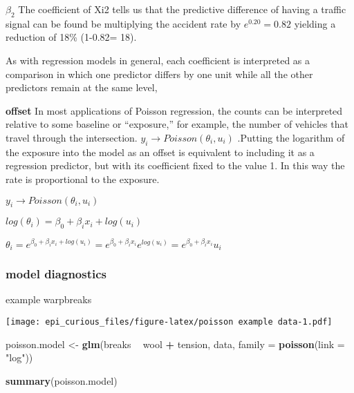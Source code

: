 \documentclass[
]{article}
\newenvironment{Shaded}{\begin{snugshade}}{\end{snugshade}}
\newcommand{\DataTypeTok}[1]{\textcolor[rgb]{0.13,0.29,0.53}{#1}}
\newcommand{\KeywordTok}[1]{\textcolor[rgb]{0.13,0.29,0.53}{\textbf{#1}}}
\newcommand{\NormalTok}[1]{#1}
\newcommand{\OperatorTok}[1]{\textcolor[rgb]{0.81,0.36,0.00}{\textbf{#1}}}
\newcommand{\StringTok}[1]{\textcolor[rgb]{0.31,0.60,0.02}{#1}}
\begin{document}
\(\beta_2\) The coefficient of Xi2 tells us that the predictive
difference of having a traffic signal can be found be multiplying the
accident rate by \(e^{0.20} = 0.82\) yielding a reduction of 18\%
(1-0.82= 18).

As with regression models in general, each coefficient is interpreted as
a comparison in which one predictor differs by one unit while all the
other predictors remain at the same level,

\textbf{offset} In most applications of Poisson regression, the counts
can be interpreted relative to some baseline or ``exposure,'' for
example, the number of vehicles that travel through the intersection.
\(y_i \to Poisson(\theta_i, u_i)\) .Putting the logarithm of the
exposure into the model as an offset is equivalent to including it as a
regression predictor, but with its coefficient fixed to the value 1. In
this way the rate is proportional to the exposure.

\(y_i \to Poisson(\theta_i, u_i)\)

\(log(\theta_i)= \beta_0 +\beta_ix_i + log(u_i)\)

\(\theta_i=e^{\beta_0 +\beta_ix_i + log(u_i)} = e^{\beta_0 +\beta_ix_i}e^{log(u_i)}= e^{\beta_0 +\beta_ix_i}u_i\)

\hypertarget{model-diagnostics-1}{%
\subsubsection{model diagnostics}\label{model-diagnostics-1}}

example warpbreaks

\begin{Shaded}
\end{Shaded}

\texttt{[image: epi\_curious\_files/figure-latex/poisson example data-1.pdf]}

\begin{Shaded}
\begin{Highlighting}[]
\NormalTok{poisson.model <-}\StringTok{ }\KeywordTok{glm}\NormalTok{(breaks }\OperatorTok{~}\StringTok{ }\NormalTok{wool }\OperatorTok{+}\StringTok{ }\NormalTok{tension, data, }\DataTypeTok{family =} \KeywordTok{poisson}\NormalTok{(}\DataTypeTok{link =} \StringTok{"log"}\NormalTok{))}

\KeywordTok{summary}\NormalTok{(poisson.model)}
\end{Highlighting}
\end{Shaded}
\end{document}
